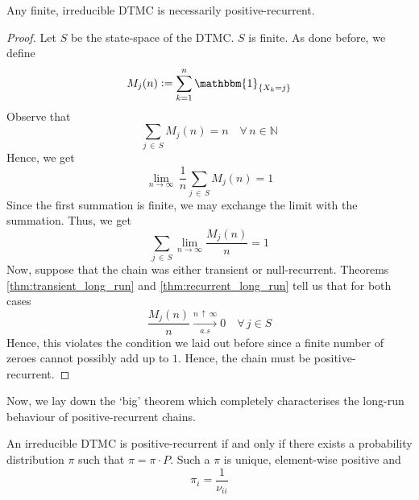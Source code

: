 \documentclass[12pt]{article}
\theoremstyle{definition}
\begin{document}
\begin{lem} \label{lem:finite_irreducible_positive}
    Any finite, irreducible DTMC is necessarily positive-recurrent.
\end{lem}

\begin{proof}
    Let $S$ be the state-space of the DTMC. $S$ is finite. As done before, we define
    \[
        M_j(n) \vcentcolon= \sum_{k=1}^{n} \mathbbm{1}_{\left\{ X_k = j \right\}}
    \]  
    Observe that
    \[
        \sum_{j \, \in \, S} M_j(n) = n \quad \forall \, n \in \mathbb{N}
    \]
    Hence, we get
    \[
        \lim_{n \to \infty} \, \frac{1}{n} \sum_{j \, \in \, S} M_j(n) = 1 
    \]  
    Since the first summation is finite, we may exchange the limit with the summation. Thus, we get
    \[
        \sum_{j \, \in \, S} \lim_{n \to \infty} \frac{M_j(n)}{n} = 1
    \]
    Now, suppose that the chain was either transient or null-recurrent. Theorems \ref{thm:transient_long_run} and \ref{thm:recurrent_long_run} tell us that for both cases
    \[
        \frac{M_j(n)}{n} \xrightarrow[a.s]{n \, \uparrow \, \infty} 0 \quad \forall \, j \in S
    \]
    Hence, this violates the condition we laid out before since a finite number of zeroes cannot possibly add up to $1$. Hence, the chain must be positive-recurrent.
\end{proof}

Now, we lay down the `big' theorem which completely characterises the long-run behaviour of positive-recurrent chains.

\begin{thm}
    An irreducible DTMC is positive-recurrent if and only if there exists a probability distribution $\pi$ such that $\pi = \pi \cdot P$. Such a $\pi$ is unique, element-wise positive and
    \[
        \pi_i = \frac{1}{\nu_{ii}}
    \]  
\end{thm}
\end{document}
